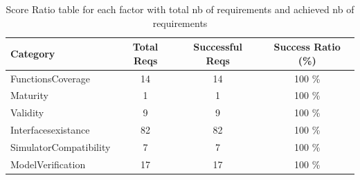 \documentclass{article}
\begin{document}
						\begin{table}
						\centering
						\caption{Score Ratio table for each factor with total nb of requirements and achieved nb of requirements}
						\begin{tabular}{|l|c|c|c|}
						\hline
						Category & Total Reqs & Successful Reqs & Success Ratio (\%) \\
						\hline

							    FunctionsCoverage & 14 & 14 & 100 \% \\
							 

							    Maturity & 1 & 1 & 100 \% \\
							 

							    Validity & 9 & 9 & 100 \% \\
							 

							    Interfacesexistance & 82 & 82 & 100 \% \\
							 

							    SimulatorCompatibility & 7 & 7 & 100 \% \\
							 

							    ModelVerification & 17 & 17 & 100 \% \\
							 
					
						
						\hline
						\end{tabular}
						\end{table}




										
								

			
\end{document}
